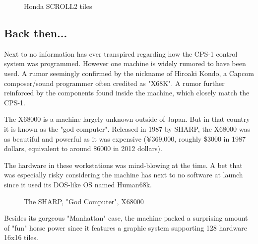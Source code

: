 \begin{figure}[H]
 \caption*{Honda SCROLL2 tiles}%
 \end{figure}%
\pagebreak

\subsection{Back then...}
Next to no information has ever transpired regarding how the CPS-1 control system was programmed. However one machine is widely rumored to have been used. A rumor seemingly confirmed by the nickname of Hiroaki Kondo, a Capcom composer/sound programmer often credited as "X68K". A rumor further reinforced by the components found inside the machine, which closely match the CPS-1.

The X68000 is a machine largely unknown outside of Japan. But in that country it is known as the "god computer". 
Released in 1987 by SHARP, the X68000 was as beautiful and powerful as it was expensive (¥369,000, roughly \$3000 in 1987 dollars, equivalent to around \$6000 in 2012 dollars).

The hardware in these workstations was mind-blowing at the time. A bet that was especially risky considering the machine has next to no software at launch since it used its DOS-like OS named Human68k.

\vfill

 \begin{figure}[H]
\caption*{The SHARP, "God Computer", X68000 }
\end{figure}


\pagebreak




Besides its gorgeous "Manhattan" case, the machine packed a surprising amount of "fun" horse power since it features a graphic system supporting 128 hardware 16x16 tiles.

